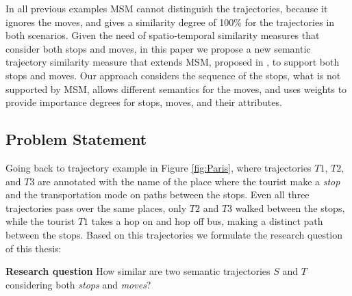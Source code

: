 \documentclass[12pt]{article}
\begin{document}

In all previous examples MSM cannot distinguish the trajectories, because it ignores the moves, and gives a similarity degree of 100\% for the trajectories in both scenarios.
Given the need of spatio-temporal similarity measures that consider both stops and moves, in this paper we propose a new semantic trajectory similarity measure that extends MSM, proposed in \cite{Furtado:TGIS12156}, to support both stops and moves. Our approach considers the sequence of the stops, what is not supported by MSM, allows different semantics for the moves, and uses weights to provide importance degrees for stops, moves, and their attributes. 

\subsection{Problem Statement}

Going back to trajectory example in Figure \ref{fig:Paris}, where trajectories $T1$, $T2$, and $T3$ are annotated with the name of the place where the tourist make a \emph{stop} and the transportation mode on paths between the stops. Even all three trajectories pass over the same places, only $T2$ and $T3$ walked between the stops, while the tourist $T1$ takes a hop on and hop off bus, making a distinct path between the stops. Based on this trajectories we formulate the research question of this thesis:

\textbf{Research question} How similar are two semantic trajectories $S$ and $T$ considering both \emph{stops} and \emph{moves}?
\end{document}
